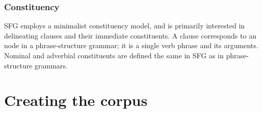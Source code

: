 \documentclass[11pt]{article}
\begin{document}
\subsubsection{Constituency}

SFG employs a minimalist constituency model, and is primarily interested in delineating clauses and their immediate constituents. A clause corresponds to an  node in a phrase-structure grammar; it is a single verb phrase and its arguments. Nominal and adverbial constituents are defined the same in SFG as in phrase-structure grammars.






\section{Creating the corpus}


\end{document}
